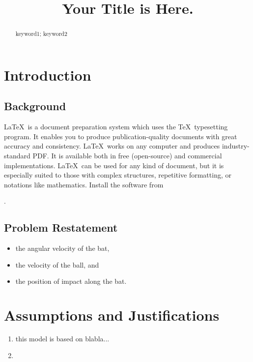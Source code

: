 \documentclass{mcmthesis}
\title{Your Title is Here.}
\numberwithin{equation}{section}
\numberwithin{figure}{section}
\numberwithin{table}{section}
\begin{document}
\begin{abstract}
\lipsum[1]
\begin{keywords}
keyword1; keyword2
\end{keywords}
\end{abstract}


\maketitle

\newpage \pagestyle{empty}
\tableofcontents
\newpage

\section{Introduction} 
\pagestyle{fancy} 
\setcounter{page}{1}
\subsection{Background}
\LaTeX\ is a document preparation system which uses the \TeX\
typesetting program. It enables you to produce
publication-quality documents with great accuracy and
consistency. \LaTeX\ works on any computer and produces
industry-standard PDF. It is available both in free (open-source)
and commercial implementations. \LaTeX\ can be used for any kind
of document, but it is especially suited to those with complex
structures, repetitive formatting, or notations like
mathematics. Install the software from

.
\subsection{Problem Restatement}
\begin{itemize}
\item the angular velocity of the bat,
\item the velocity of the ball, and
\item the position of impact along the bat.
\end{itemize}


\section{Assumptions and Justifications}

\begin{enumerate}
	\item this model is based on blabla...

	\item 
\end{enumerate}
\end{document}

